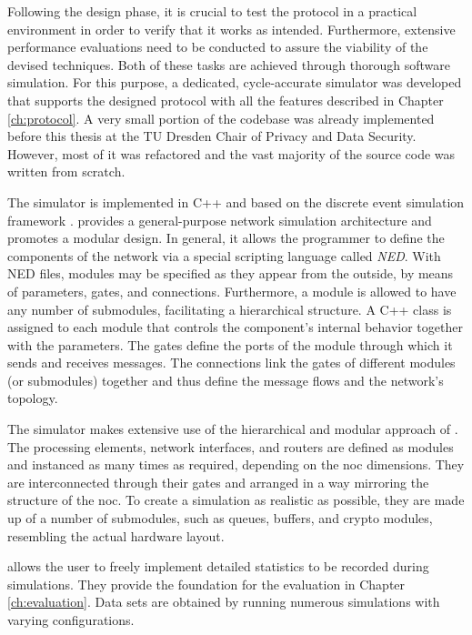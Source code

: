 Following the design phase, it is crucial to test the protocol in a practical environment in order to verify that it works as intended. Furthermore,
extensive performance evaluations need to be conducted to assure the viability of the devised techniques. Both of these tasks are achieved through
thorough software simulation. For this purpose, a dedicated, cycle-accurate simulator was developed that supports the designed protocol with all the
features described in Chapter \ref{ch:protocol}. A very small portion of the codebase was already implemented before this thesis at the TU Dresden
Chair of Privacy and Data Security. However, most of it was refactored and the vast majority of the source code was written from scratch.

The simulator is implemented in C++ and based on the \textit{\omnet{}} discrete event simulation framework \cite{omnet}. \omnet{} provides a general-purpose
network simulation architecture and promotes a modular design. In general, it allows the programmer to define the components of the network via a
special scripting language called \textit{NED}. With NED files, modules may be specified as they appear from the outside, by means of parameters,
gates, and connections. Furthermore, a module is allowed to have any number of submodules, facilitating a hierarchical structure. A C++
class is assigned to each module that controls the component's internal behavior together with the parameters. The gates define the ports of the
module through which it sends and receives messages. The connections link the gates of different modules (or submodules) together and thus define the
message flows and the network's topology.

The simulator makes extensive use of the hierarchical and modular approach of \omnet{}. The processing elements, network interfaces, and routers are
defined as modules and instanced as many times as required, depending on the \gls{noc} dimensions. They are interconnected through their gates and
arranged in a way mirroring the structure of the \gls{noc}. To create a simulation as realistic as possible, they are made up of a number of
submodules, such as queues, buffers, and crypto modules, resembling the actual hardware layout.

\omnet{} allows the user to freely implement detailed statistics to be recorded during simulations. They provide the foundation for the evaluation
in Chapter \ref{ch:evaluation}. Data sets are obtained by running numerous simulations with varying configurations.

